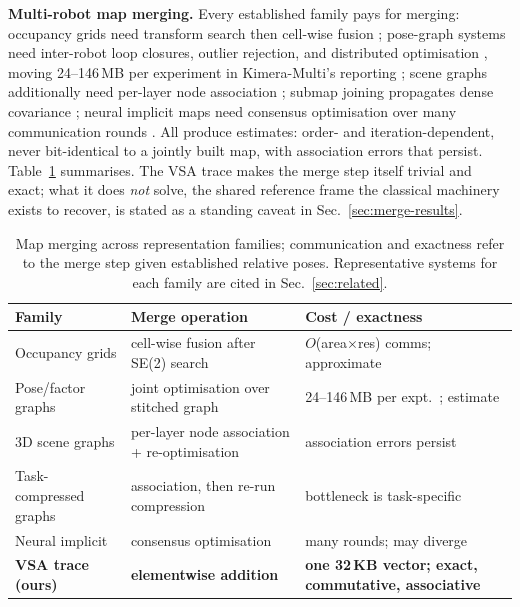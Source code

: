 \documentclass[conference]{IEEEtran}
\begin{document}
\textbf{Multi-robot map merging.} Every established family pays for
merging: occupancy grids need transform search then cell-wise fusion
\cite{birk2006merging,carpin2008fast}; pose-graph systems need
inter-robot loop closures, outlier rejection, and distributed
optimisation
\cite{cunningham2010ddfsam,mangelson2018pcm,lajoie2020doorslam,tian2022kimeramulti,cramariuc2023maplab,lajoie2024swarmslam},
moving 24--146\,MB per experiment in Kimera-Multi's reporting
\cite{tian2022kimeramulti}; scene graphs additionally need per-layer node
association \cite{chang2023hydramulti}; submap joining propagates dense
covariance \cite{tardos2002robust,huang2008slsjf,zhao2019linear}; neural
implicit maps need consensus optimisation over many communication rounds
\cite{hu2023cpslam,dinerf2024,magicslam2025}. All produce estimates:
order- and iteration-dependent, never bit-identical to a jointly built
map, with association errors that persist. Table~\ref{tab:merge-survey}
summarises. The VSA trace makes the merge step itself trivial and exact;
what it does \emph{not} solve, the shared reference frame the classical
machinery exists to recover, is stated as a standing caveat in
Sec.~\ref{sec:merge-results}.

\begin{table}[t]
\caption{Map merging across representation families; communication and
exactness refer to the merge step given established relative poses.
Representative systems for each family are cited in
Sec.~\ref{sec:related}.}
\label{tab:merge-survey}
\centering
\small
\begin{tabular}{@{}p{2.1cm}p{2.6cm}p{2.9cm}@{}}
\toprule
Family & Merge operation & Cost / exactness \\
\midrule
Occupancy grids & cell-wise fusion after SE(2) search & $O$(area$\times$res) comms; approximate \\
Pose/factor graphs & joint optimisation over stitched graph & 24--146\,MB per expt.\ \cite{tian2022kimeramulti}; estimate \\
3D scene graphs & per-layer node association + re-optimisation & association errors persist \cite{chang2023hydramulti} \\
Task-compressed graphs & association, then re-run compression & bottleneck is task-specific \cite{maggio2024clio} \\
Neural implicit & consensus optimisation & many rounds; may diverge \\
\textbf{VSA trace (ours)} & \textbf{elementwise addition} & \textbf{one 32\,KB vector; exact, commutative, associative} \\
\bottomrule
\end{tabular}
\end{table}
\end{document}
